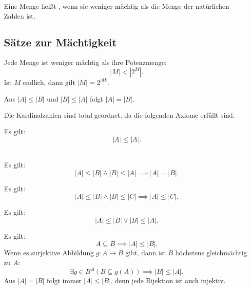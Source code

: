 \begin{definition}
Eine Menge heißt , wenn sie weniger mächtig
als die Menge der natürlichen Zahlen ist.
\end{definition}

\subsection{Sätze zur Mächtigkeit}
Jede Menge ist weniger mächtig als ihre Potenzmenge:
\begin{equation}
|M|<|2^M|.
\end{equation}
Ist $M$ endlich, dann gilt $|M|=2^{|M|}$.

\noindent
{}

Aus $|A|\le |B|$ und $|B|\le |A|$ folgt $|A|=|B|$.

\noindent
{}
Die Kardinalzahlen sind total geordnet, da die folgenden Axiome
erfüllt sind.

 Es gilt:
\begin{equation}
|A|\le |A|.
\end{equation}

\\
\indent Es gilt:
\begin{equation}
|A|\le |B| \land |B|\le |A|\implies |A|=|B|.
\end{equation}

 Es gilt:
\begin{equation}
|A|\le |B| \land |B|\le |C|\implies |A|\le |C|.
\end{equation}

 Es gilt:
\begin{equation}
|A|\le |B| \lor |B|\le |A|.
\end{equation}

\newpage
\noindent
{}

\noindent
Es gilt:
\begin{equation}
A\subseteq B \implies |A|\le |B|.
\end{equation}
Wenn es surjektive Abbildung $g\colon A\to B$ gibt,
dann ist $B$ höchstens gleichmächtig zu $A$:
\begin{equation}
\exists g{\in}B^A (B\subseteq g(A))\implies |B|\le |A|.
\end{equation}
Aus $|A|=|B|$ folgt immer $|A|\le |B|$, denn jede Bijektion
ist auch injektiv.

